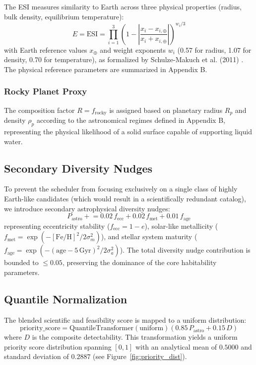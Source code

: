 \documentclass[11pt,a4paper]{article}
\begin{document}
The ESI measures similarity to Earth across three physical properties (radius, bulk density, equilibrium temperature):
\begin{equation}
E = \text{ESI} = \prod_{i=1}^{3} \left(1 - \left|\frac{x_i - x_{i,\oplus}}{x_i + x_{i,\oplus}}\right|\right)^{w_i / 3}
\label{eq:esi}
\end{equation}
with Earth reference values $x_{\oplus}$ and weight exponents $w_i$ (0.57 for radius, 1.07 for density, 0.70 for temperature), as formalized by Schulze-Makuch et al. (2011) \cite{schulze2011}. The physical reference parameters are summarized in Appendix B.

\subsubsection{Rocky Planet Proxy}

The composition factor $R = f_{\text{rocky}}$ is assigned based on planetary radius $R_p$ and density $\rho_p$ according to the astronomical regimes defined in Appendix B, representing the physical likelihood of a solid surface capable of supporting liquid water.

\subsection{Secondary Diversity Nudges}

To prevent the scheduler from focusing exclusively on a single class of highly Earth-like candidates (which would result in a scientifically redundant catalog), we introduce secondary astrophysical diversity nudges:
\begin{equation}
P_{\text{astro}} \mathrel{+}= 0.02\, f_{\text{ecc}} + 0.02\, f_{\text{met}} + 0.01\, f_{\text{age}}
\label{eq:nudge}
\end{equation}
representing eccentricity stability ($f_{\text{ecc}} = 1 - e$), solar-like metallicity ($f_{\text{met}} = \exp(-[\text{Fe/H}]^2 / 2 \sigma_m^2)$), and stellar system maturity ($f_{\text{age}} = \exp(-(\text{age} - 5\,\text{Gyr})^2 / 2 \sigma_a^2)$). The total diversity nudge contribution is bounded to $\leq 0.05$, preserving the dominance of the core habitability parameters.

\subsection{Quantile Normalization}

The blended scientific and feasibility score is mapped to a uniform distribution:
\begin{equation}
\text{priority\_score} = \text{QuantileTransformer}(\text{uniform})\!\left(0.85\, P_{\text{astro}} + 0.15\, D\right)
\label{eq:qnorm}
\end{equation}
where $D$ is the composite detectability. This transformation yields a uniform priority score distribution spanning $[0, 1]$ with an analytical mean of $0.5000$ and standard deviation of $0.2887$ (see Figure~\ref{fig:priority_dist}).
\end{document}
